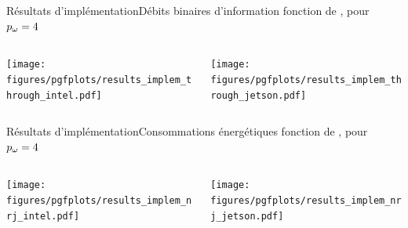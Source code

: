 \documentclass[../main.tex]{subfiles}
\begin{document}
\begin{frame}{Résultats d'implémentation}{Débits binaires d'information fonction de \textcolor{Red}{\pd{}}, pour \textcolor{Blue}{$p_\omega{} = 4$}}
  \begin{columns}
    \begin{column}{.5\linewidth}
      \begin{overlayarea}{\linewidth}{.75\textheight}
        \centering
        \texttt{[image: figures/pgfplots/results\_implem\_through\_intel.pdf]}
      \end{overlayarea}
    \end{column}
    \begin{column}{.5\linewidth}
      \begin{overlayarea}{\linewidth}{.75\textheight}
        \centering
        \texttt{[image: figures/pgfplots/results\_implem\_through\_jetson.pdf]}
      \end{overlayarea}
    \end{column}
  \end{columns}

\end{frame}

\begin{frame}{Résultats d'implémentation}{Consommations énergétiques fonction de \textcolor{Red}{\pd{}}, pour \textcolor{Blue}{$p_\omega{} = 4$}}
  \begin{columns}
    \begin{column}{.5\linewidth}
      \begin{overlayarea}{\linewidth}{.75\textheight}
        \centering
        \texttt{[image: figures/pgfplots/results\_implem\_nrj\_intel.pdf]}
      \end{overlayarea}
    \end{column}
    \begin{column}{.5\linewidth}
      \begin{overlayarea}{\linewidth}{.75\textheight}
        \centering
        \texttt{[image: figures/pgfplots/results\_implem\_nrj\_jetson.pdf]}
      \end{overlayarea}
    \end{column}
  \end{columns}
  
\end{frame}
\end{document}
